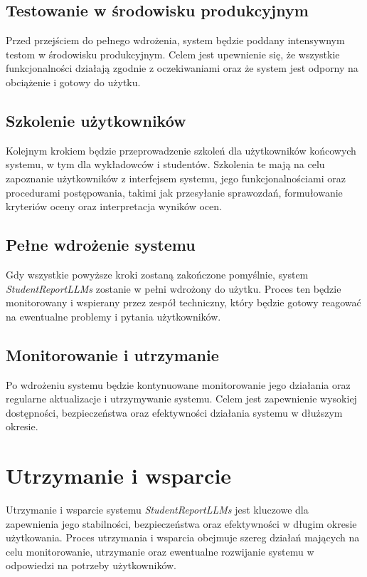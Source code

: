 \documentclass[a4paper, 12pt]{article}
\begin{document}
\subsection{Testowanie w środowisku produkcyjnym}

Przed przejściem do pełnego wdrożenia, system będzie poddany intensywnym testom w środowisku produkcyjnym. Celem jest upewnienie się, że wszystkie funkcjonalności działają zgodnie z oczekiwaniami oraz że system jest odporny na obciążenie i gotowy do użytku.

\subsection{Szkolenie użytkowników}

Kolejnym krokiem będzie przeprowadzenie szkoleń dla użytkowników końcowych systemu, w tym dla wykładowców i studentów. Szkolenia te mają na celu zapoznanie użytkowników z interfejsem systemu, jego funkcjonalnościami oraz procedurami postępowania, takimi jak przesyłanie sprawozdań, formułowanie kryteriów oceny oraz interpretacja wyników ocen.

\subsection{Pełne wdrożenie systemu}

Gdy wszystkie powyższe kroki zostaną zakończone pomyślnie, system \textit{StudentReportLLMs} zostanie w pełni wdrożony do użytku. Proces ten będzie monitorowany i wspierany przez zespół techniczny, który będzie gotowy reagować na ewentualne problemy i pytania użytkowników.

\subsection{Monitorowanie i utrzymanie}

Po wdrożeniu systemu będzie kontynuowane monitorowanie jego działania oraz regularne aktualizacje i utrzymywanie systemu. Celem jest zapewnienie wysokiej dostępności, bezpieczeństwa oraz efektywności działania systemu w dłuższym okresie.
\section{Utrzymanie i wsparcie}
Utrzymanie i wsparcie systemu \textit{StudentReportLLMs} jest kluczowe dla zapewnienia jego stabilności, bezpieczeństwa oraz efektywności w długim okresie użytkowania. Proces utrzymania i wsparcia obejmuje szereg działań mających na celu monitorowanie, utrzymanie oraz ewentualne rozwijanie systemu w odpowiedzi na potrzeby użytkowników.
\end{document}
